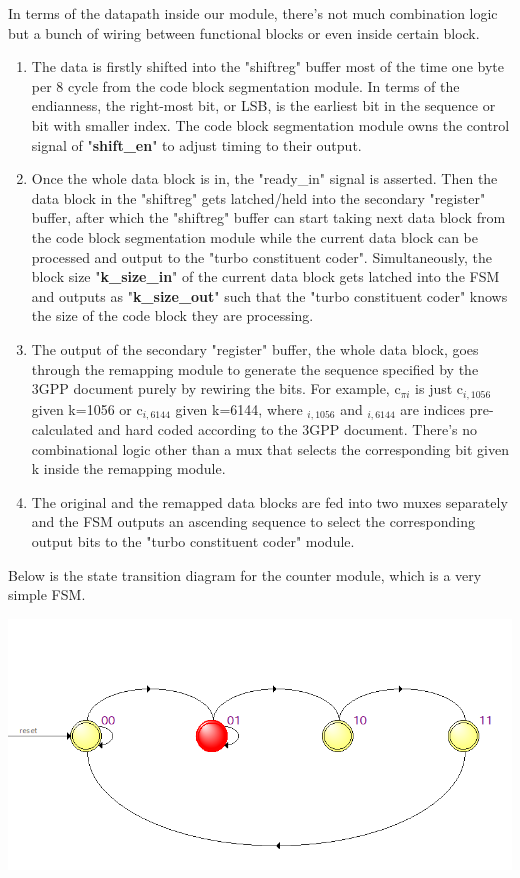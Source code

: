\documentclass[letterpaper, 12pt]{article} %
\begin{document}
In terms of the datapath inside our module, there's not much combination logic but a bunch of wiring between functional blocks or even inside certain block.

\begin{enumerate}
    \item The data is firstly shifted into the "shiftreg" buffer most of the time one byte per 8 cycle from the code block segmentation module. In terms of the endianness, the right-most bit, or LSB, is the earliest bit in the sequence or bit with smaller index. The code block segmentation module owns the control signal of "{\bf shift\_en}" to adjust timing to their output.
    \item Once the whole data block is in, the "ready\_in" signal is asserted. Then the data block in the "shiftreg" gets latched/held into the secondary "register" buffer, after which the "shiftreg" buffer can start taking next data block from the code block segmentation module while the current data block can be processed and output to the "turbo constituent coder". Simultaneously, the block size "{\bf k\_size\_in}" of the current data block gets latched into the FSM and outputs as "{\bf k\_size\_out}" such that the "turbo constituent coder" knows the size of the code block they are processing.
    \item The output of the secondary "register" buffer, the whole data block, goes through the remapping module to generate the sequence specified by the 3GPP document purely by rewiring the bits. For example, c$_{\pi i}$ is just c$_{i,1056}$ given k=1056 or c$_{i,6144}$ given k=6144, where $_{i,1056}$ and $_{i,6144}$ are indices pre-calculated and hard coded according to the 3GPP document. There's no combinational logic other than a mux that selects the corresponding bit given k inside the remapping module.
    \item The original and the remapped data blocks are fed into two muxes separately and the FSM outputs an ascending sequence to select the corresponding output bits to the "turbo constituent coder" module.
\end{enumerate}

Below is the state transition diagram for the counter module, which is a very simple FSM.

\begin{center}
    \includegraphics[width=14cm, angle=0]{files/states}
\end{center}
\end{document}
